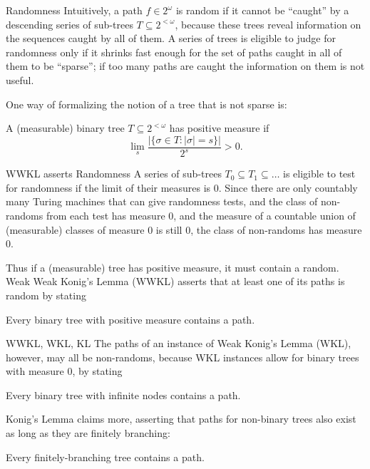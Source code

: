 \begin{frame}{Randomness}
  Intuitively, a path $f\in2^\omega$ is random if it cannot be ``caught''
  by a descending series of sub-trees $T\subseteq2^{<\omega}$, because
  these trees reveal information on the sequences caught by all of them. A
  series of trees is eligible to judge for randomness only if it shrinks
  fast enough for the set of paths caught in all of them to be ``sparse'';
  if too many paths are caught the information on them is not useful.

  \vspace{1em}
  One way of formalizing the notion of a tree that is not sparse is:
  \begin{define*}
    A (measurable) binary tree $T\subseteq2^{<\omega}$ has positive measure
    if
    \[\lim_s \frac{|\{\sigma\in T: |\sigma|=s\}|}{2^s} >0.\]
  \end{define*}
\end{frame}

\begin{frame}{WWKL asserts Randomness}
  A series of sub-trees $T_0\subseteq T_1\subseteq\ldots$ is eligible to
  test for randomness if the limit of their measures is 0. Since there are
  only countably many Turing machines that can give randomness tests,
  and the class of non-randoms from each test has measure 0, and the
  measure of a countable union of (measurable) classes of measure 0 is
  still 0, the class of non-randoms has measure 0.

  \vspace{2em}
  Thus if a (measurable) tree has positive measure, it must contain a
  random. Weak Weak Konig's Lemma (WWKL) asserts that at least one of its
  paths is random by stating
  \begin{thm*}
    Every binary tree with positive measure contains a path.
  \end{thm*}
\end{frame}

\begin{frame}{WWKL, WKL, KL}
  The paths of an instance of Weak Konig's Lemma (WKL), however, may
  all be non-randoms, because WKL instances allow for binary trees with
  measure 0, by stating
  \begin{thm*}
    Every binary tree with infinite nodes contains a path.
  \end{thm*}

  \vspace{2em}
  Konig's Lemma claims more, asserting that paths for non-binary
  trees also exist as long as they are finitely branching: 
  \begin{thm*}
    Every finitely-branching tree contains a path.
  \end{thm*}
\end{frame}

